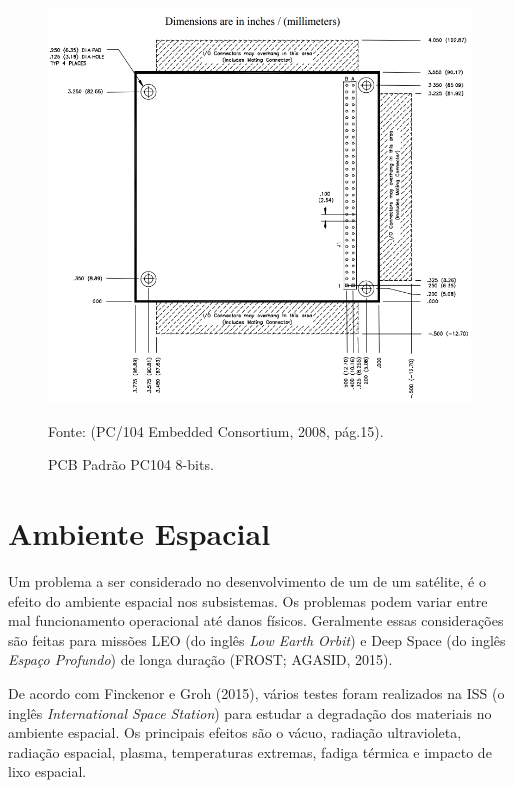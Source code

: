 \begin{figure}[h]
	\centering
    \caption{ PCB Padrão PC104 8-bits.}
    
	\includegraphics[keepaspectratio=true,scale=0.55]{figuras/pc104.PNG}
	
	Fonte: (PC/104 Embedded Consortium, 2008, pág.15).\linebreak
	\label{fig16}
\end{figure}

\section{Ambiente Espacial}
Um problema a ser considerado no desenvolvimento de um de um satélite, é o efeito do ambiente espacial nos subsistemas. Os problemas podem variar entre mal funcionamento operacional até danos físicos. Geralmente essas considerações são feitas para missões LEO (do inglês \textit{Low Earth Orbit}) e Deep Space (do inglês \textit{Espaço Profundo}) de longa duração (FROST; AGASID, 2015).

De acordo com Finckenor e Groh (2015), vários testes foram realizados na ISS (o inglês \textit{International Space Station}) para estudar a degradação dos materiais no ambiente espacial. Os principais efeitos são o vácuo, radiação ultravioleta, radiação espacial, plasma, temperaturas extremas, fadiga térmica e impacto de lixo espacial. 

